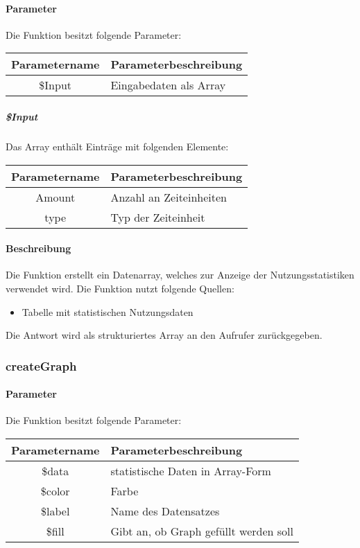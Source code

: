 \paragraph{Parameter} Die Funktion besitzt folgende Parameter:
\begin{table}[H]
	\begin{tabular}{|c|p{11cm}|}
		\hline
		\textbf{Parametername} & \textbf{Parameterbeschreibung} \\ \hline
		\$Input & Eingabedaten als Array \\ \hline
	\end{tabular}
\end{table}
\subparagraph{\$Input}Das Array enthält Einträge mit folgenden Elemente:
\begin{table}[H]
	\begin{tabular}{|c|p{11cm}|}
		\hline
		\textbf{Parametername} & \textbf{Parameterbeschreibung} \\ \hline
		Amount & Anzahl an Zeiteinheiten \\ \hline
		type   & Typ der Zeiteinheit \\ \hline
	\end{tabular}
\end{table}
\paragraph{Beschreibung} Die Funktion erstellt ein Datenarray, welches zur Anzeige der Nutzungsstatistiken verwendet wird. Die Funktion nutzt folgende Quellen:
\begin{itemize}
	\item Tabelle mit statistischen Nutzungsdaten
\end{itemize}
Die Antwort wird als strukturiertes Array an den Aufrufer zurückgegeben.
\subsubsection{createGraph}
\paragraph{Parameter} Die Funktion besitzt folgende Parameter:
\begin{table}[H]
	\begin{tabular}{|c|p{11cm}|}
		\hline
		\textbf{Parametername} & \textbf{Parameterbeschreibung} \\ \hline
		\$data  & statistische Daten in Array-Form \\ \hline
		\$color & Farbe \\ \hline
		\$label & Name des Datensatzes \\ \hline
		\$fill  & Gibt an, ob Graph gefüllt werden soll \\ \hline
	\end{tabular}
\end{table}
